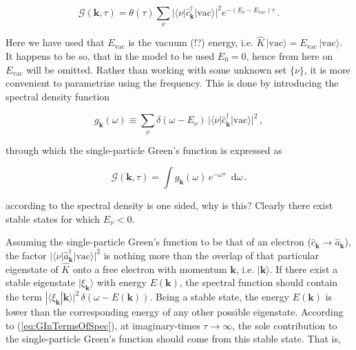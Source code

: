 \documentclass[12pt]{report}
\renewcommand{\vec}[1]{\boldsymbol{\mathbf{#1}}}                        %
\newcommand*\diff{\mathop{}\!\mathrm{d}}
\newcommand{\Gt}{\mathcal{G}}
\newcommand{\question}[1]{{\leavevmode\color{question}#1}}
\begin{document}
\begin{equation}
	\label{eq:startingPointFreePropagator}
	\Gt(\vec k, \tau) = \theta(\tau)
	\sum_\nu | \langle \nu | \hat c^\dagger_{\vec k} | \text{vac} \rangle |^2 e^{-(E_\nu - E_\text{vac})\tau} \,.
\end{equation}

Here we have used that $ E_\text{vac} $ is the vacuum \question{(!?)} energy, i.e. $ \hat K \, | \text{vac} \rangle = E_\text{vac} \, | \text{vac} \rangle $. It happens to be so, that in the model to be used $ E_0 = 0 $, hence from here on $ E_\text{vac} $ will be omitted. Rather than working with some unknown set $ \{ \nu \} $, it is more convenient to parametrize using the frequency. This is done by introducing the spectral density function
 
 \begin{equation}
	g_{\vec{k}} (\omega)
	\equiv \sum_\nu \delta (\omega - E_\nu) \, | \langle \nu | \hat c^\dagger_{\vec k} | \text{vac} \rangle |^2 \,,
\end{equation}

through which the single-particle Green's function is expressed as

\begin{equation}
	\label{eq:GInTermsOfSpec}
	\Gt(\vec k, \tau) = \int g_{\vec k} (\omega) \, e^{- \omega \tau} \diff \omega \,.
\end{equation}

\question{according to \cite{MishchenkoA.2000DqMC} the spectral density is one sided, why is this? Clearly there exist stable states for which $ E_\nu < 0 $.}

Assuming the single-particle Green's function to be that of an electron ($ \hat c_{\vec k} \rightarrow \hat a_{\vec k} $), the factor $ | \langle \nu | \hat a^\dagger_{\vec k} | \text{vac} \rangle |^2 $ is nothing more than the overlap of that particular eigenstate of $ \hat K $ onto a free electron with momentum $ \vec k $, i.e. $ | \vec k \rangle $. If there exist a stable eigenstate $  | \xi_{\vec k} \rangle $ with energy $ E(\vec k) $, the spectral function should contain the term $ | \langle \xi_{\vec k} | \vec k \rangle |^2 \, \delta(\omega - E(\vec k)) $. Being a stable state, the energy $ E(\vec k) $ is lower than the corresponding energy of any other possible eigenstate. According to (\ref{eq:GInTermsOfSpec}), at imaginary-times $ \tau \rightarrow \infty $, the sole contribution to the single-particle Green's function should come from this stable state. That is,
\end{document}
